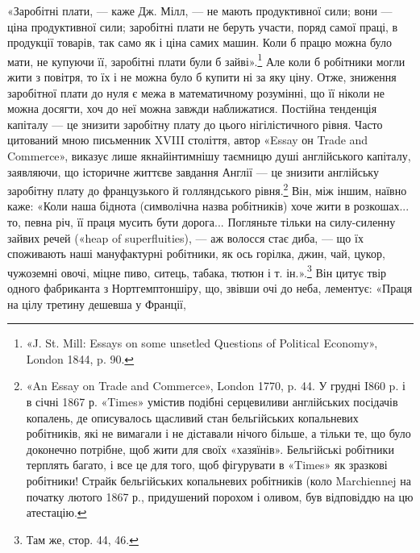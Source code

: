 «Заробітні плати, — каже Дж. Мілл, — не мають продуктивної
сили; вони — ціна продуктивної сили; заробітні плати не
беруть участи, поряд самої праці, в продукції товарів, так само
як і ціна самих машин. Коли б працю можна було мати, не купуючи
її, заробітні плати були б зайві».\footnote{
«J. St. Mill: Essays on some unsetled Questions of Political Economy»,
London 1844, p. 90.
} Але коли б робітники
могли жити з повітря, то їх і не можна було б купити ні за яку ціну.
Отже, зниження заробітної плати до нуля є межа в математичному
розумінні, що її ніколи не можна досягти, хоч до неї можна
завжди наближатися. Постійна тенденція капіталу — це знизити
заробітну плату до цього нігілістичного рівня. Часто цитований
мною письменник XVIII століття, автор «Essay он Trade and
Commerce», виказує лише якнайінтимнішу таємницю душі англійського
капіталу, заявляючи, що історичне життєве завдання
Англії — це знизити англійську заробітну плату до французького
й голляндського рівня.\footnote{
«An Essay on Trade and Commerce», London 1770, p. 44. У грудні
I860 p. і в січні 1867 р. «Times» умістив подібні серцевиливи англійських
посідачів копалень, де описувалось щасливий стан бельгійських
копальневих робітників, які не вимагали і не діставали нічого більше,
а тільки те, що було доконечно потрібне, щоб жити для своїх «хазяїнів».
Бельгійські робітники терплять багато, і все це для того, щоб фігурувати
в «Times» як зразкові робітники! Страйк бельгійських копальневих
робітників (коло Marchiennej на початку лютого 1867 р., придушений
порохом і оливом, був відповіддю на цю атестацію.
} Він, між іншим, наївно каже: «Коли
наша біднота (символічна назва робітників) хоче жити в розкошах...
то, певна річ, її праця мусить бути дорога... Погляньте
тільки на силу-силенну зайвих речей («heap of superfluities), —
аж волосся стає диба, — що їх споживають наші мануфактурні
робітники, як ось горілка, джин, чай, цукор, чужоземні
овочі, міцне пиво, ситець, табака, тютюн і т. ін.».\footnote{
Там же, стор. 44, 46.
} Він цитує
твір одного фабриканта з Нортгемптоншіру, що, звівши очі до
неба, лементує: «Праця на цілу третину дешевша у Франції,
\parbreak{}  %
